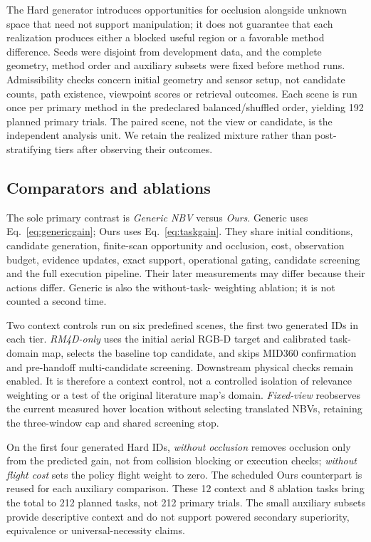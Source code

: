 The Hard generator introduces opportunities for occlusion alongside unknown
space that need not support manipulation; it does not guarantee that each
realization produces either a blocked useful region or a favorable method
difference. Seeds were disjoint from development data, and the complete
geometry, method order and auxiliary subsets were fixed before method runs.
Admissibility checks concern initial geometry and sensor setup, not candidate
counts, path existence, viewpoint scores or retrieval outcomes. Each scene is
run once per primary method in the predeclared balanced/shuffled order, yielding
192 planned primary trials. The paired scene, not the view or candidate, is the
independent analysis unit. We retain the realized mixture rather than
post-stratifying tiers after observing their outcomes.

\subsection{Comparators and ablations}
\label{sec:baselines}
The sole primary contrast is \emph{Generic NBV} versus \emph{Ours}. Generic uses
Eq.~\eqref{eq:genericgain}; Ours uses Eq.~\eqref{eq:taskgain}. They share initial
conditions, candidate generation, finite-scan opportunity and occlusion, cost,
observation budget, evidence updates, exact support, operational gating,
candidate screening and the full execution pipeline. Their later measurements
may differ because their actions differ. Generic is also the without-task-
weighting ablation; it is not counted a second time.

Two context controls run on six predefined scenes, the first two generated
IDs in each tier. \emph{RM4D-only} uses the initial aerial RGB-D target and
calibrated task-domain map, selects the baseline top candidate, and skips
MID360 confirmation and pre-handoff multi-candidate screening. Downstream
physical checks remain enabled. It is therefore a context control, not a
controlled isolation of relevance weighting or a test of the original
literature map's domain. \emph{Fixed-view} reobserves the current measured hover
location without selecting translated NBVs, retaining the three-window cap and
shared screening stop.

On the first four generated Hard IDs, \emph{without occlusion} removes occlusion
only from the predicted gain, not from collision blocking or execution checks;
\emph{without flight cost} sets the policy flight weight to zero. The scheduled
Ours counterpart is reused for each auxiliary comparison. These 12 context and
8 ablation tasks bring the total to 212 planned tasks, not 212 primary trials.
The small auxiliary subsets provide descriptive context and do not support
powered secondary superiority, equivalence or universal-necessity claims.

